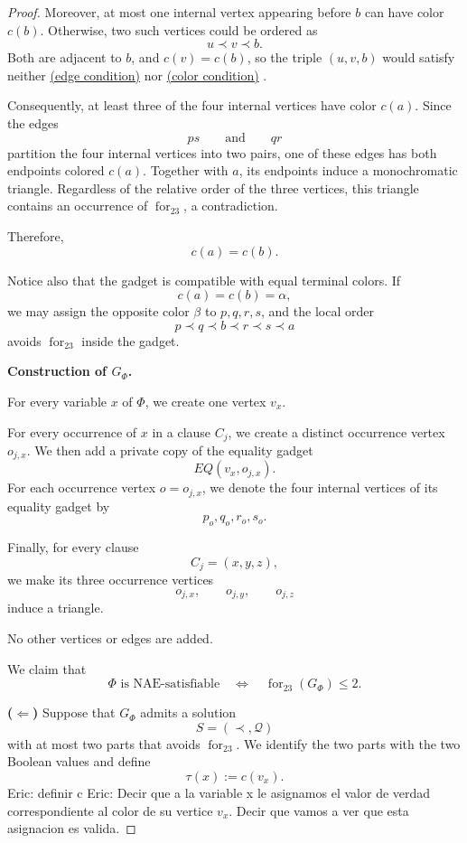 \documentclass[12pt]{article}
\theoremstyle{plain}
\theoremstyle{definition}
\theoremstyle{remark}
\theoremstyle{definition}
\newcommand{\edgecondition}{%
  \hyperref[def:avoid:cond:edge]{(edge condition)}\xspace
}
\newcommand{\colorcondition}{%
  \hyperref[def:avoid:cond:color]{(color condition)}\xspace
}
\newcommand{\forlabel}{\mathrm{for}}
\DeclareRobustCommand{\forparam}[1]{%
  \ensuremath{\mathop{\forlabel}\nolimits_{#1}}%
}
\newcommand{\eric}[1]{%
  \textcolor{green!50!black}{Eric: #1}%
}
\begin{document}
\begin{proof}
Moreover, at most one internal vertex appearing before \(b\) can have color \(c(b)\). Otherwise, two such vertices
could be ordered as
\[
u\prec v\prec b.
\]
Both are adjacent to \(b\), and \(c(v)=c(b)\), so the triple \((u,v,b)\) would satisfy neither
\edgecondition{} nor \colorcondition{}.

Consequently, at least three of the four internal vertices have color \(c(a)\). Since the edges
\[
ps
\qquad\text{and}\qquad
qr
\]
partition the four internal vertices into two pairs, one of these edges has both endpoints colored \(c(a)\).
Together with \(a\), its endpoints induce a monochromatic triangle. Regardless of the relative order of the three
vertices, this triangle contains an occurrence of \(\operatorname{for}_{23}\), a contradiction.

Therefore,
\[
c(a)=c(b).
\]

Notice also that the gadget is compatible with equal terminal colors. If
\[
c(a)=c(b)=\alpha,
\]
we may assign the opposite color \(\beta\) to \(p,q,r,s\), and the local order
\[
p\prec q\prec b\prec r\prec s\prec a
\]
avoids \(\operatorname{for}_{23}\) inside the gadget.

\medskip
\noindent\textbf{Construction of \(G_\Phi\).}

For every variable \(x\) of \(\Phi\), we create one vertex
\(
v_x.
\)

For every occurrence of \(x\) in a clause \(C_j\), we create a distinct occurrence vertex
\(
o_{j,x}.
\)
We then add a private copy of the equality gadget
\[
EQ(v_x,o_{j,x}).
\]
For each occurrence vertex \(o=o_{j,x}\), we denote the four internal vertices of its equality gadget by
\[
p_o,q_o,r_o,s_o.
\]

Finally, for every clause
\[
C_j=(x,y,z),
\]
we make its three occurrence vertices
\[
o_{j,x},\qquad o_{j,y},\qquad o_{j,z}
\]
induce a triangle.

No other vertices or edges are added.

We claim that
\[
\Phi\text{ is NAE-satisfiable}
\quad\Longleftrightarrow\quad
\forparam{23}(G_\Phi)\le2.
\]

\medskip
\noindent\textbf{(\(\Leftarrow\))}
Suppose that \(G_\Phi\) admits a solution
\[
S=(\prec,\mathcal Q)
\]
with at most two parts that avoids \(\operatorname{for}_{23}\). We identify the two parts with the two Boolean
values and define
\[
\tau(x):=c(v_x).
\]\eric{definir c}\eric{Decir que a la variable x le asignamos el valor de verdad correspondiente al color de su vertice $v_x$. Decir que vamos a ver que esta asignacion es valida.}


\end{proof}
\end{document}
